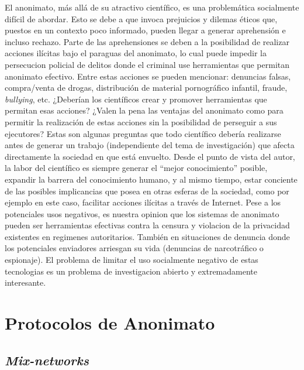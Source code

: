 El anonimato, más allá de su atractivo científico, es una problemática 
socialmente difícil de abordar. Esto se debe a que invoca prejuicios y dilemas 
éticos que, puestos en un contexto poco informado, pueden llegar a generar 
aprehensión e incluso rechazo. Parte de las aprehensiones se deben a la 
posibilidad de realizar acciones ilícitas bajo el paraguas del anonimato, lo 
cual puede impedir la persecucion policial de delitos donde el criminal use 
herramientas que permitan anonimato efectivo. Entre estas acciones se pueden 
mencionar: denuncias falsas, compra/venta de drogas, distribución de material 
pornográfico infantil, fraude, \emph{bullying}, etc. ¿Deberían los científicos 
crear y promover herramientas que permitan esas acciones? ¿Valen la pena las 
ventajas del anonimato como para permitir la realización de estas acciones sin 
la posibilidad de perseguir a sus ejecutores? Estas son algunas preguntas que 
todo científico debería realizarse antes de generar un trabajo (independiente 
del tema de investigación) que afecta directamente la sociedad en que está 
envuelto. Desde el punto de vista del autor, la labor del científico es 
siempre generar el ``mejor conocimiento'' posible, expandir la barrera del 
conocimiento humano, y al mismo tiempo, estar conciente de las posibles 
implicancias que posea en otras esferas de la sociedad, como por ejemplo en 
este caso, facilitar acciones ilícitas a través de Internet. Pese a los 
potenciales usos negativos, es nuestra opinion que los sistemas de anonimato 
pueden ser herramientas efectivas contra la censura y violacion de la 
privacidad existentes en regimenes autoritarios. También en situaciones de 
denuncia donde los potenciales enviadores arriesgan su vida (denuncias de 
narcotráfico o espionaje). El problema de limitar el uso socialmente negativo 
de estas tecnologias es un problema de investigacion abierto y extremadamente 
interesante.  

\section{Protocolos de Anonimato}

\subsection{\emph{Mix-networks}}

